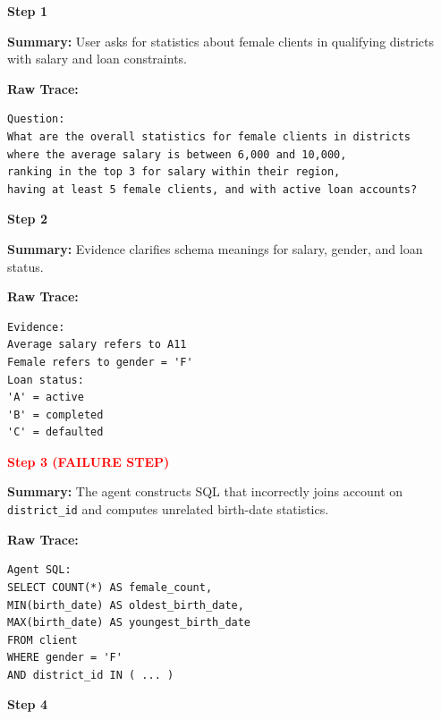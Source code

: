 \documentclass[11pt]{article}
\begin{document}



\clearpage

\begin{tcolorbox}[
breakable,
colback=customwhite,
colframe=customred,
title=False Assumption,
fontupper=\fontfamily{pcr}\selectfont\scriptsize
]

\textbf{Step 1}

\textbf{Summary:}  
User asks for statistics about female clients in qualifying districts with salary and loan constraints.

\textbf{Raw Trace:}
\begin{verbatim}
Question:
What are the overall statistics for female clients in districts
where the average salary is between 6,000 and 10,000,
ranking in the top 3 for salary within their region,
having at least 5 female clients, and with active loan accounts?
\end{verbatim}

\medskip
\textbf{Step 2}

\textbf{Summary:}  
Evidence clarifies schema meanings for salary, gender, and loan status.

\textbf{Raw Trace:}
\begin{verbatim}
Evidence:
Average salary refers to A11
Female refers to gender = 'F'
Loan status:
'A' = active
'B' = completed
'C' = defaulted
\end{verbatim}

\medskip
\textbf{\textcolor{red}{Step 3 (FAILURE STEP)}}

\textbf{Summary:}  
The agent constructs SQL that incorrectly joins account on \texttt{district\_id} and computes unrelated birth-date statistics.

\textbf{Raw Trace:}
\begin{verbatim}
Agent SQL:
SELECT COUNT(*) AS female_count,
MIN(birth_date) AS oldest_birth_date,
MAX(birth_date) AS youngest_birth_date
FROM client
WHERE gender = 'F'
AND district_id IN ( ... )
\end{verbatim}

\medskip
\textbf{Step 4}


\end{tcolorbox}
\end{document}
